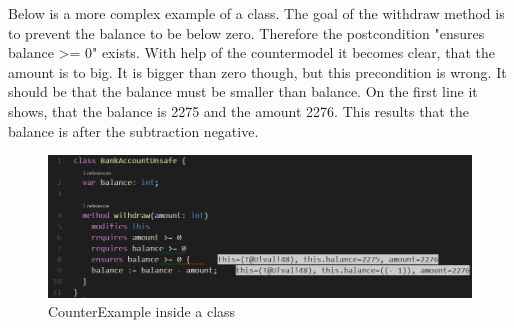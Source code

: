 Below is a more complex example of a class. The goal of the withdraw method is to prevent the balance to be below zero. Therefore the postcondition "ensures balance >= 0" exists. With help of the countermodel it becomes clear, that the amount is to big. It is bigger than zero though, but this precondition is wrong. It should be that the balance must be smaller than balance. On the first line it shows, that the balance is 2275 and the amount 2276. This results that the balance is after the subtraction negative. 
\begin{figure}[H]
	\centering
	\includegraphics[width=1\textwidth]{img/counterModelBank}
	\caption{CounterExample inside a class}
	\label{fig:counterModelBank}
\end{figure}



